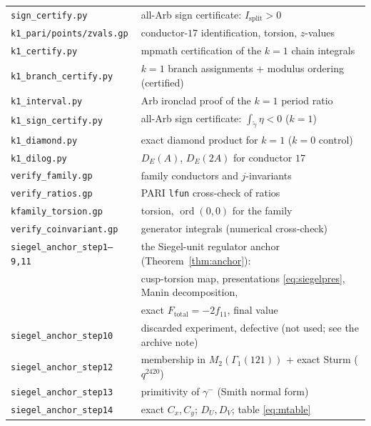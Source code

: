 \documentclass[11pt]{amsart}
\theoremstyle{definition}
\theoremstyle{remark}
\begin{document}
\begin{center}
\begin{tabular}{@{}ll@{}}
\texttt{sign\_certify.py} & all-Arb sign certificate: $I_{\mathrm{split}}>0$\\
\texttt{k1\_pari/points/zvals.gp} & conductor-$17$ identification, torsion, $z$-values\\
\texttt{k1\_certify.py} & mpmath certification of the $k=1$ chain integrals\\
\texttt{k1\_branch\_certify.py} & $k=1$ branch assignments + modulus ordering (certified)\\
\texttt{k1\_interval.py} & Arb ironclad proof of the $k=1$ period ratio\\
\texttt{k1\_sign\_certify.py} & all-Arb sign certificate: $\int_{\tilde\gamma}\eta<0$ ($k=1$)\\
\texttt{k1\_diamond.py} & exact diamond product for $k=1$ ($k=0$ control)\\
\texttt{k1\_dilog.py} & $D_E(A)$, $D_E(2A)$ for conductor $17$\\
\texttt{verify\_family.gp} & family conductors and $j$-invariants\\
\texttt{verify\_ratios.gp} & PARI \texttt{lfun} cross-check of ratios\\
\texttt{kfamily\_torsion.gp} & torsion, $\operatorname{ord}(0,0)$ for the family\\
\texttt{verify\_coinvariant.gp} & generator integrals (numerical cross-check)\\
\texttt{siegel\_anchor\_step1--9,11} & the Siegel-unit regulator anchor
  (Theorem~\ref{thm:anchor}):\\
  & cusp-torsion map, presentations \eqref{eq:siegelpres}, Manin
    decomposition,\\
  & exact $F_{\mathrm{total}}=-2f_{11}$, final value\\
\texttt{siegel\_anchor\_step10} & discarded experiment, defective
  (not used; see the archive note)\\
\texttt{siegel\_anchor\_step12} & membership in $M_2(\Gamma_1(121))$ +
  exact Sturm ($q^{2420}$)\\
\texttt{siegel\_anchor\_step13} & primitivity of $\gamma^-$ (Smith normal
  form)\\
\texttt{siegel\_anchor\_step14} & exact $C_x,C_y$; $D_U,D_V$; table
  \eqref{eq:mtable}\\
\bottomrule
\end{tabular}
\end{center}
\end{document}
